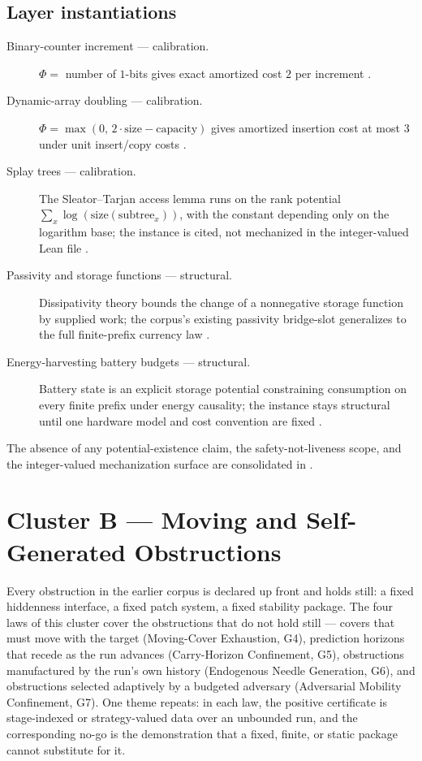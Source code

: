\documentclass[11pt]{article}
\newcommand{\clusterB}{Moving and Self-Generated Obstructions}
\newcommand{\lawGFour}{Moving-Cover Exhaustion}
\newcommand{\lawGFive}{Carry-Horizon Confinement}
\newcommand{\lawGSix}{Endogenous Needle Generation}
\newcommand{\lawGSeven}{Adversarial Mobility Confinement}
\theoremstyle{definition}
\begin{document}
\subsection*{Layer instantiations}\label{layer-inst:G3}
\begin{description}
  \item[Binary-counter increment --- calibration.] $\Phi = $ number of $1$-bits gives exact amortized
    cost $2$ per increment \citep{Tarjan1985,CormenEtAl}.
  \item[Dynamic-array doubling --- calibration.] $\Phi = \max(0,\, 2 \cdot \mathrm{size} -
    \mathrm{capacity})$ gives amortized insertion cost at most $3$ under unit insert/copy costs
    \citep{CormenEtAl}.
  \item[Splay trees --- calibration.] The Sleator--Tarjan access lemma runs on the rank potential
    $\sum_x \log(\mathrm{size}(\mathrm{subtree}_x))$, with the constant depending only on the
    logarithm base; the instance is cited, not mechanized in the integer-valued Lean file
    \citep{SleatorTarjan1985}.
  \item[Passivity and storage functions --- structural.] Dissipativity theory bounds the change of a
    nonnegative storage function by supplied work; the corpus's existing passivity bridge-slot
    generalizes to the full finite-prefix currency law \citep{Willems1972,Tsiokos2026EmergenceCalculus}.
  \item[Energy-harvesting battery budgets --- structural.] Battery state is an explicit storage
    potential constraining consumption on every finite prefix under energy causality; the instance
    stays structural until one hardware model and cost convention are fixed
    \citep{OzelEtAl,YangUlukus}.
\end{description}

The absence of any potential-existence claim, the safety-not-liveness scope, and the integer-valued
mechanization surface are consolidated in .

 \section{Cluster B --- \clusterB}\label{sec:clusterB}

Every obstruction in the earlier corpus is declared up front and holds still: a fixed hiddenness
interface, a fixed patch system, a fixed stability package. The four laws of this cluster cover the
obstructions that do not hold still --- covers that must move with the target (\lawGFour, G4),
prediction horizons that recede as the run advances (\lawGFive, G5), obstructions manufactured by the
run's own history (\lawGSix, G6), and obstructions selected adaptively by a budgeted adversary
(\lawGSeven, G7). One theme repeats: in each law, the positive certificate is stage-indexed or
strategy-valued data over an unbounded run, and the corresponding no-go is the demonstration that a
fixed, finite, or static package cannot substitute for it.
\end{document}
